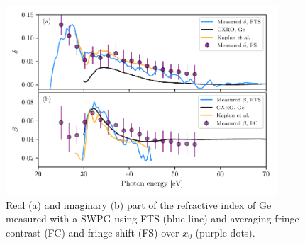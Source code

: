 \begin{figure}
	\centering
	\includegraphics[width=0.9\textwidth]{figures/refractive_index/ge_refractive.pdf}
	\caption[Measured real and imaginary part of the refractive index of Ge using a SWPG]{Real (a) and imaginary (b) part of the refractive index of Ge measured with a SWPG using FTS (blue line) and averaging fringe contrast (FC) and fringe shift (FS) over $x_0$ (purple dots).}
	\label{fig:measured_delta_beta_ge}
\end{figure}

